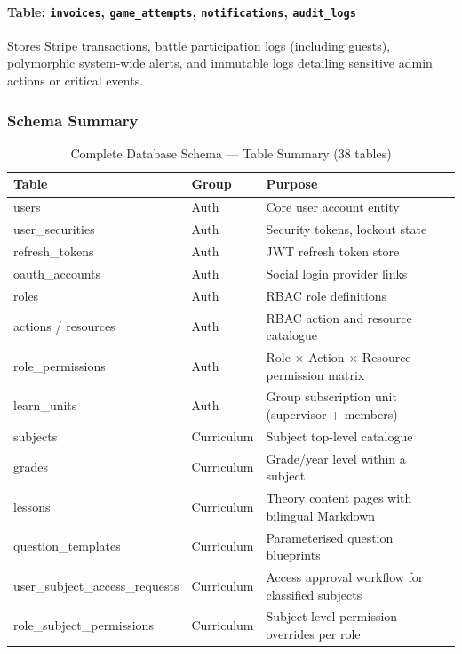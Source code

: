 \paragraph{Table: \texttt{invoices}, \texttt{game\_attempts}, \texttt{notifications}, \texttt{audit\_logs}}
Stores Stripe transactions, battle participation logs (including guests), polymorphic system-wide alerts, and immutable logs detailing sensitive admin actions or critical events.

\subsubsection{Schema Summary}

\begin{longtable}{|p{5.4cm}|p{2.2cm}|p{6.4cm}|}
\caption{Complete Database Schema --- Table Summary (38 tables)}
\label{table:schema_summary} \\
\hline \textbf{Table} & \textbf{Group} & \textbf{Purpose} \\ \hline
users & Auth & Core user account entity \\ \hline
user\_securities & Auth & Security tokens, lockout state \\ \hline
refresh\_tokens & Auth & JWT refresh token store \\ \hline
oauth\_accounts & Auth & Social login provider links \\ \hline
roles & Auth & RBAC role definitions \\ \hline
actions / resources & Auth & RBAC action and resource catalogue \\ \hline
role\_permissions & Auth & Role $\times$ Action $\times$ Resource permission matrix \\ \hline
learn\_units & Auth & Group subscription unit (supervisor + members) \\ \hline
subjects & Curriculum & Subject top-level catalogue \\ \hline
grades & Curriculum & Grade/year level within a subject \\ \hline
lessons & Curriculum & Theory content pages with bilingual Markdown \\ \hline
question\_templates & Curriculum & Parameterised question blueprints \\ \hline
user\_subject\_access\_requests & Curriculum & Access approval workflow for classified subjects \\ \hline
role\_subject\_permissions & Curriculum & Subject-level permission overrides per role \\ \hline

\end{longtable}
